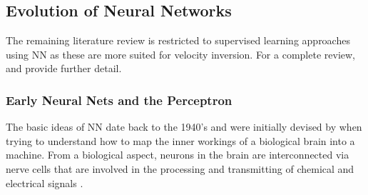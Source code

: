 
\subsection{Evolution of Neural Networks}\label{sec:evo_NN}
The remaining literature review is restricted to supervised learning approaches using NN as these are more suited for velocity inversion. For a complete review, \cite{Lippmann1987} and \cite{Chentouf1997} provide further detail. 

\subsubsection{Early Neural Nets and the Perceptron}\label{sec:early_nn}
The basic ideas of \ac{NN} date back to the 1940’s and were initially devised by \citet{McCulloch1943} when trying to understand how to map the inner workings of a biological brain into a machine. From a biological aspect, neurons in the brain are interconnected via nerve cells that are involved in the processing and transmitting of chemical and electrical signals \citep{McCulloch1943}. 


